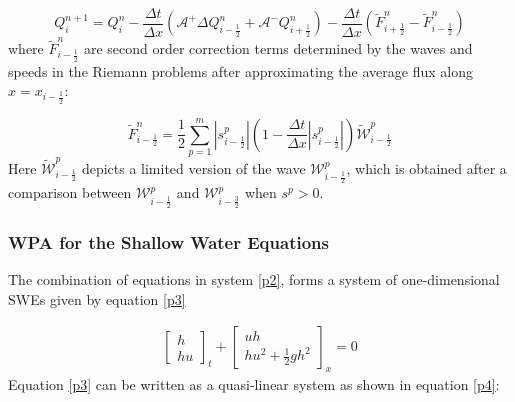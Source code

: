 \documentclass[12pt,a4paper]{article}
\begin{document}
{	\begin{equation}
		Q_{i}^{n+1} =  Q_{i}^{n} - \frac{\Delta t}{\Delta x}(\mathcal{A^{+}}\Delta 	Q_{i-\frac{1}{2}}^{n} + \mathcal{A^{-}}Q_{i+\frac{1}{2}}^{n}) -  \frac{\Delta t}{\Delta x} (\tilde{F}_{i+\frac{1}{2}}^{n} - \tilde{F}_{i-\frac{1}{2}}^{n} )
		\label{wpa2}
	\end{equation}
	where $\tilde{F}_{i-\frac{1}{2}}^{n} $ are second order correction terms determined by the waves and speeds in the Riemann problems after approximating the average flux along  $x = x_{i - \frac{1}{2}}$:
	
	\begin{equation}
		\tilde{F}_{i-\frac{1}{2}}^{n} = \frac{1}{2} \sum_{p=1}^{m}  |s_{i- \frac{1}{2}}^{p}| \left( 1 - \frac{\Delta t}{\Delta x} |s_{i- \frac{1}{2}}^{p}|\right) \tilde{\mathcal{W}}_{i-\frac{1}{2}}^{p} 
		\label{wpa13}
	\end{equation}
	Here $\tilde{\mathcal{W}}_{i-\frac{1}{2}}^{p} $ depicts a limited version of the wave $\mathcal{W}_{i-\frac{1}{2}}^{p} $, which is obtained after a comparison between $\mathcal{W}_{i-\frac{1}{2}}^{p} $ and $\mathcal{W}_{i-\frac{3}{2}}^{p} $ when $s^{p} >0$\cite{ba-le-mi-ro:2003}.\\
} %
	
	\subsubsection{WPA for the Shallow Water Equations}
	The combination of equations in system \eqref{p2}, forms a system of one-dimensional SWEs given by equation \eqref{p3}
	
	\begin{eqnarray}
		\begin{bmatrix} h \\ hu \end{bmatrix}_t + \begin{bmatrix} uh \\ hu^{2} + \frac{1}{2} gh^{2} \end{bmatrix}_x  = 0 
		\label{p3}
	\end{eqnarray}
	Equation \eqref{p3} can be written as a quasi-linear system as shown in equation \eqref{p4}:
	
\end{document}
